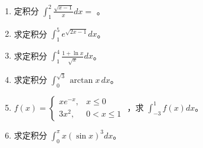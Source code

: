\documentclass[12pt, a4paper]{article}
\begin{document}
\begin{enumerate}
    \item 定积分 $ \int_{1}^{2}\frac{\sqrt{x-1}}{x}dx= $ \underline{\hspace{2cm}}。

    \item 求定积分 $ \int_{1}^{5}e^{\sqrt{2x-1}}dx $。

    \item 求定积分 $ \int_{1}^{4}\frac{1+\ln x}{\sqrt{x}}dx $。

    \item 求定积分 $ \int_{0}^{\sqrt{3}} \arctan x \, dx $。

    \item $ f(x)=\begin{cases}xe^{-x}, & x\leq0\\ 3x^{2}, & 0<x\leq1\end{cases} $ ，求 $ \int_{-3}^{1}f(x)dx $。

    \item 求定积分 $ \int_{0}^{\pi} x(\sin x)^{3}dx $。
\end{enumerate}
\end{document}
